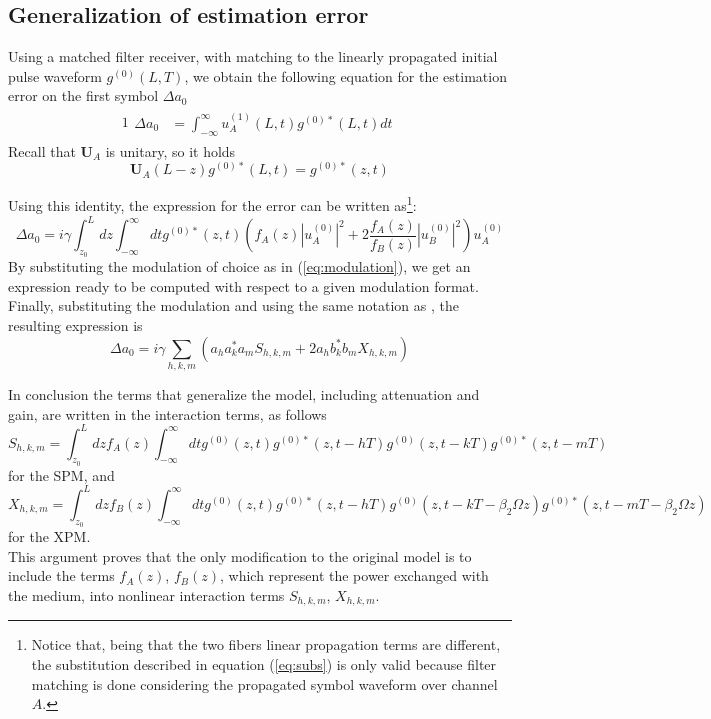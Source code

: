 \documentclass[10pt, lettersize, journal, onecolumn]{IEEEtran}
\begin{document}
\subsection{Generalization of estimation error}
Using a matched filter receiver, with matching to the linearly propagated initial pulse waveform $g^{(0)}(L, T)$, we obtain the following equation for the estimation error on the first symbol $\Delta a_0$ 
\begin{alignat}{1}
 \begin{aligned}
 \Delta a_0 &= \int_{-\infty}^{\infty} u_A^{(1)}(L, t) g^{(0)*}(L, t) dt
 \end{aligned}
\end{alignat} \label{eq:matched}
Recall that $\mathbf{U}_A$ is unitary, so it holds
\begin{equation}\label{eq:subs}
	\mathbf{U}_A(L-z) g^{(0)*}(L, t) = g^{(0)*}(z, t)
\end{equation}

Using this identity, the expression for the error can be written as\footnote{Notice that, being that the two fibers linear propagation terms are different, the substitution described in equation (\ref{eq:subs}) is only valid because filter matching is done considering the propagated symbol waveform over channel $A$.}:
\begin{equation}
	\Delta a_0 = i\gamma \int_{z_0}^{L} dz \int_{-\infty}^{\infty} dt g^{(0)*}(z, t) \left(f_A(z)|u_A^{(0)}|^2 + 2 \dfrac{f_A(z)}{f_B(z)}|u_B^{(0)}|^2\right) u_A^{(0)}
\end{equation}
By substituting the modulation of choice as in (\ref{eq:modulation}), we get an expression ready to be computed with respect to a given modulation format.
Finally, substituting the modulation and using the same notation as \cite[eq. 5, 6, 7]{Dar_2013}, the resulting expression is
\begin{equation}
	\Delta a_0 = i \gamma \sum_{h, k, m} \left(a_h a_k^* a_m S_{h, k, m} + 2 a_h b_k^* b_m X_{h, k, m}\right)
\end{equation}

In conclusion the terms that generalize the model, including attenuation and gain, are written in the interaction terms, as follows
\begin{equation}
	S_{h, k, m} = \int_{z_0}^{L} dz f_A(z) \int_{-\infty}^{\infty} dt g^{(0)}(z, t) g^{(0)*}(z, t-hT) g^{(0)}(z, t-kT)g^{(0)*}(z, t-mT)
\end{equation}
for the SPM, and
\begin{equation}\label{eq:hkm}
	X_{h, k, m} = \int_{z_0}^{L} dz f_B(z) \int_{-\infty}^{\infty} dt g^{(0)}(z, t) g^{(0)*}(z, t-hT) g^{(0)}(z, t-kT -\beta_2 \Omega z)g^{(0)*}(z, t-mT-\beta_2 \Omega z)
\end{equation}
for the XPM.\\
This argument proves that the only modification to the original model is to include the terms $f_A(z)$, $f_B(z)$, which represent the power exchanged with the medium, into nonlinear interaction terms $S_{h, k, m}, \, X_{h, k, m}$. 
\end{document}
